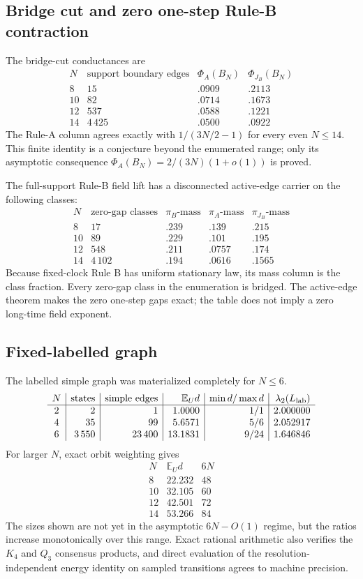 \documentclass[11pt]{article}
\newcommand{\E}{\mathbb E}
\theoremstyle{definition}
\begin{document}
\subsection{Bridge cut and zero one-step Rule-B contraction}

The bridge-cut conductances are
\[
\begin{array}{c|r|r|r}
N&\text{support boundary edges}&\Phi_A(B_N)&\Phi_{J_B}(B_N)\\ \hline
8&15&.0909&.2113\\
10&82&.0714&.1673\\
12&537&.0588&.1221\\
14&4\,425&.0500&.0922
\end{array}
\]
The Rule-A column agrees exactly with $1/(3N/2-1)$ for every even
$N\le14$.  This finite identity is a conjecture beyond the enumerated
range; only its asymptotic consequence
$\Phi_A(B_N)=2/(3N)(1+o(1))$ is proved.

The full-support Rule-B field lift has a disconnected active-edge carrier on
the following classes:
\[
\begin{array}{c|r|r|r|r}
N&\text{zero-gap classes}&\pi_B\text{-mass}
 &\pi_A\text{-mass}&\pi_{J_B}\text{-mass}\\ \hline
8&17&.239&.139&.215\\
10&89&.229&.101&.195\\
12&548&.211&.0757&.174\\
14&4\,102&.194&.0616&.1565
\end{array}
\]
Because fixed-clock Rule B has uniform stationary law, its mass column is the
class fraction.  Every zero-gap class in the enumeration is bridged.  The
active-edge theorem makes the zero one-step gaps exact; the table does not
imply a zero long-time field exponent.

\subsection{Fixed-labelled graph}

The labelled simple graph was materialized completely for $N\le6$.
\[
\begin{array}{c|r|r|r|r|r}
N&\text{states}&\text{simple edges}&\E_Ud&
  \min d/\max d&\lambda_2(L_{\rm lab})\\ \hline
2&2&1&1.0000&1/1&2.000000\\
4&35&99&5.6571&5/6&2.052917\\
6&3\,550&23\,400&13.1831&9/24&1.646846
\end{array}
\]
For larger $N$, exact orbit weighting gives
\[
\begin{array}{c|r|r}
N&\E_Ud&6N\\ \hline
8&22.232&48\\
10&32.105&60\\
12&42.501&72\\
14&53.266&84
\end{array}
\]
The sizes shown are not yet in the asymptotic $6N-O(1)$ regime, but the
ratios increase monotonically over this range.  Exact rational arithmetic
also verifies the $K_4$ and $Q_3$ consensus products, and direct evaluation
of the resolution-independent energy identity on sampled transitions agrees
to machine precision.
\end{document}
